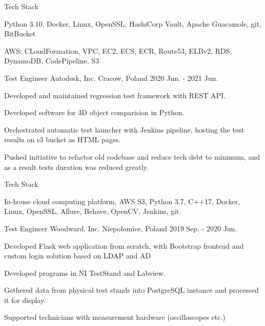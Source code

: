 \begin{cventries}
  \cventry
    {Tech Stack} %
    {}
    {}
    {}
    {
      \begin{cvitems}
        \item {Python 3.10, Docker, Linux, OpenSSL, HashiCorp Vault, Apache Guacamole, git, BitBucket}
        \item {AWS: CLoudFormation, VPC, EC2, ECS, ECR, Route53, ELBv2, RDS, DynamoDB, CodePipeline, S3}
      \end{cvitems}
    }


  \cventry
    {Test Engineer} %
    {Autodesk, Inc.} %
    {Cracow, Poland} %
    {2020 Jun. - 2021 Jun.} %
    {
      \begin{cvitems} %
        \item {Developed and maintained regression test framework with REST API.}
        \item {Developed software for 3D object comparision in Python.}
        \item {Orchestrated automatic test launcher with Jenkins pipeline, hosting the test results on s3 bucket as HTML pages.}
        \item {Pushed initiative to refactor old codebase and reduce tech debt to minimum, and as a result tests duration was reduced greatly.}
      \end{cvitems}
    }

  \cventry
    {Tech Stack} %
    {}
    {}
    {}
    {
      \begin{cvitems}
        \item {In-house cloud computing platform, AWS S3, Python 3.7, C++17, Docker, Linux, OpenSSL, Allure, Behave, OpenCV, Jenkins, git}
      \end{cvitems}
    }

  \cventry
    {Test Engineer} %
    {Woodward, Inc.} %
    {Niepołomice, Poland} %
    {2019 Sep. - 2020 Jun.} %
    {
      \begin{cvitems} %
        \item {Developed Flask web application from scratch, with Bootstrap frontend and custom login solution based on LDAP and AD}
        \item {Developed programs in NI TestStand and Labview.}
        \item {Gethered data from physical test stands into PostgreSQL instance and processed it for display.}
        \item {Supported technicians with measurement hardware (oscilloscopes etc.)}
      \end{cvitems}
    }


\end{cventries}
